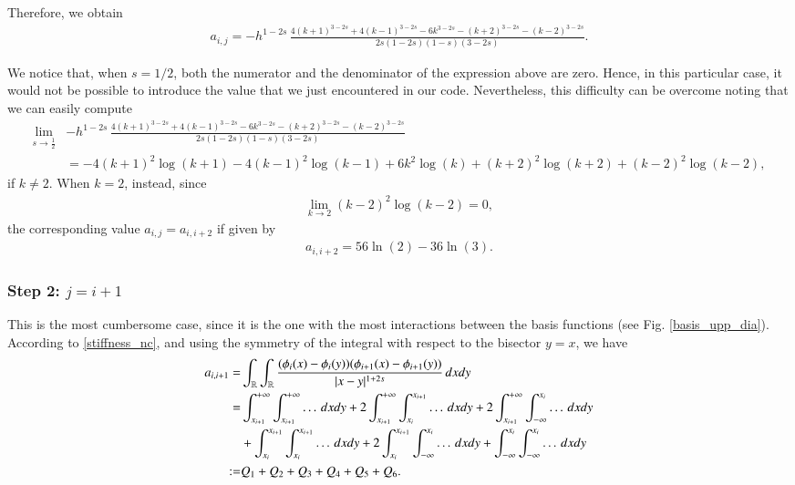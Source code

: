 {Therefore, we obtain
\begin{align*}
	a_{i,j} = - h^{1-2s}\,\frac{4(k+1)^{3-2s} + 4(k-1)^{3-2s}-6k^{3-2s}-(k+2)^{3-2s}-(k-2)^{3-2s}}{2s(1-2s)(1-s)(3-2s)}.
\end{align*} 

We notice that, when $s=1/2$, both the numerator and the denominator of the expression above are zero. Hence, in this particular case, it would not be possible to introduce the value that we just encountered in our code. Nevertheless, this difficulty can be overcome noting that we can easily compute
\begin{align*}
	\lim_{s\to\frac{1}{2}} &- h^{1-2s}\,\frac{4(k+1)^{3-2s} + 4(k-1)^{3-2s}-6k^{3-2s}-(k+2)^{3-2s}-(k-2)^{3-2s}}{2s(1-2s)(1-s)(3-2s)}
	\\
	& = -4(k+1)^2\log(k+1)-4(k-1)^2\log(k-1)+6k^2\log(k)+(k+2)^2\log(k+2)+(k-2)^2\log(k-2),
\end{align*} 
if $k\neq 2$. When $k=2$, instead, since 
\begin{align*}
	\lim_{k\to 2} (k-2)^2\log(k-2) =0,
\end{align*}
the corresponding value $a_{i,j}=a_{i,i+2}$ if given by 
\begin{align*}
	a_{i,i+2} = 56\ln(2)-36\ln(3).
\end{align*}


\subsubsection*{Step 2: $j= i+1$}
This is the most cumbersome case, since it is the one with the most interactions between the basis functions (see Fig. \ref{basis_upp_dia}). According to \eqref{stiffness_nc}, and using the symmetry of the integral with respect to the bisector $y=x$, we have 
	\begin{align*}
	a_{i,i+1}= & \int_{\mathbb{R}}\int_{\mathbb{R}}\frac{(\phi_i(x)-\phi_i(y))(\phi_{i+1}(x)-\phi_{i+1}(y))}{|x-y|^{1+2s}}\,dxdy
	\\
	= & \int_{x_{i+1}}^{+\infty}\int_{x_{i+1}}^{+\infty} \ldots\,dxdy + 2\int_{x_{i+1}}^{+\infty}\int_{x_i}^{x_{i+1}} \ldots\,dxdy + 2\int_{x_{i+1}}^{+\infty}\int_{-\infty}^{x_i} \ldots\,dxdy 
	\\
	& + \int_{x_i}^{x_{i+1}}\int_{x_i}^{x_{i+1}} \ldots\,dxdy + 2\int_{x_i}^{x_{i+1}}\int_{-\infty}^{x_i} \ldots\,dxdy + \int_{-\infty}^{x_i}\int_{-\infty}^{x_i} \ldots\,dxdy 
	\\
	:= & Q_1 + Q_2 + Q_3 + Q_4 + Q_5 + Q_6.
\end{align*}

}
